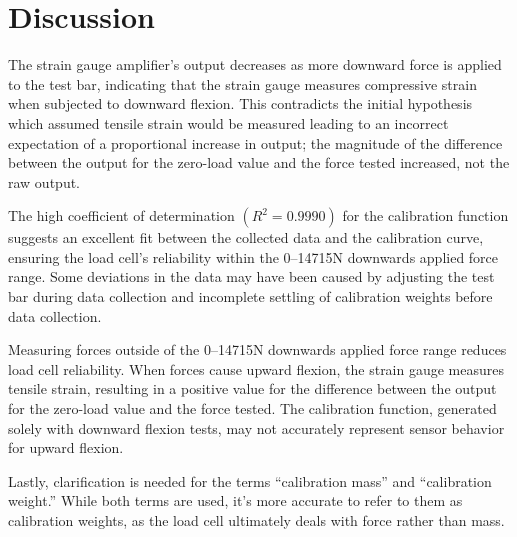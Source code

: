 \documentclass[conference, letterpaper]{IEEEtran}
\begin{document}
\section{Discussion}
The strain gauge amplifier's output decreases as more downward force is applied to the test bar, indicating that the strain gauge measures compressive strain when subjected to downward flexion. This contradicts the initial hypothesis which assumed tensile strain would be measured leading to an incorrect expectation of a proportional increase in output; the magnitude of the difference between the output for the zero-load value and the force tested increased, not the raw output. \par
\smallskip
The high coefficient of determination \((R^2 = 0.9990)\) for the calibration function suggests an excellent fit between the collected data and the calibration curve, ensuring the load cell's reliability within the 0--14715N downwards applied force range. Some deviations in the data may have been caused by adjusting the test bar during data collection and incomplete settling of calibration weights before data collection. \par
\smallskip
Measuring forces outside of the 0--14715N downwards applied force range reduces load cell reliability. When forces cause upward flexion, the strain gauge measures tensile strain, resulting in a positive value for the difference between the output for the zero-load value and the force tested. The calibration function, generated solely with downward flexion tests, may not accurately represent sensor behavior for upward flexion. \par
\smallskip
Lastly, clarification is needed for the terms ``calibration mass'' and ``calibration weight.'' While both terms are used, it's more accurate to refer to them as calibration weights, as the load cell ultimately deals with force rather than mass. \par



\end{document}
